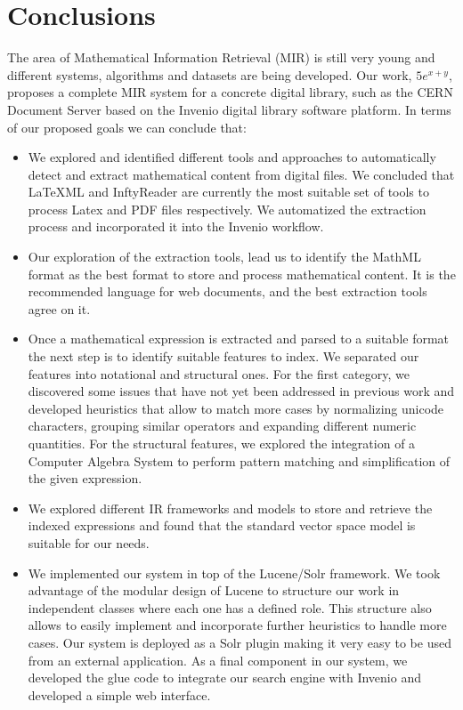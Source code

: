 \chapter{Conclusions}
\label{chap-conclusions}

The area of Mathematical Information Retrieval (MIR) is still very young and different systems, algorithms and datasets are being developed. Our work, $5e^{x+y}$, proposes a complete MIR system for a concrete digital library, such as the CERN Document Server based on the Invenio digital library software platform. In terms of our proposed goals we can conclude that:

\begin{itemize}
\item We explored and identified different tools and approaches to automatically detect and extract mathematical content from digital files. We concluded that LaTeXML and InftyReader are currently the most suitable set of tools to process Latex and PDF files respectively. We automatized the extraction process and incorporated it into the Invenio workflow.
\item Our exploration of the extraction tools, lead us to identify the MathML format as the best format to store and process mathematical content. It is the recommended language for web documents, and the best extraction tools agree on it.
\item Once a mathematical expression is extracted and parsed to a suitable format the next step is to identify suitable features to index. We separated our features into notational and structural ones. For the first category, we discovered  some issues that have not yet been addressed in previous work and developed heuristics that allow to match more cases by normalizing unicode characters, grouping similar operators and expanding different numeric quantities. For the structural features, we explored the integration of a Computer Algebra System  to perform pattern matching and simplification of the given expression. 
\item We explored different IR frameworks and models to store and retrieve the indexed expressions and found that the standard vector space model is suitable for our needs.  
\item We implemented our system in top of the Lucene/Solr framework. We took advantage of the modular design of Lucene to structure our work in independent classes where each one has a defined role. This structure also allows to easily implement and incorporate further heuristics to handle more cases. Our system is deployed as a Solr plugin making it very easy to be used from an external application. As a final component in our system, we developed the glue code to integrate our search engine with Invenio and developed a simple web interface.

\end{itemize}
